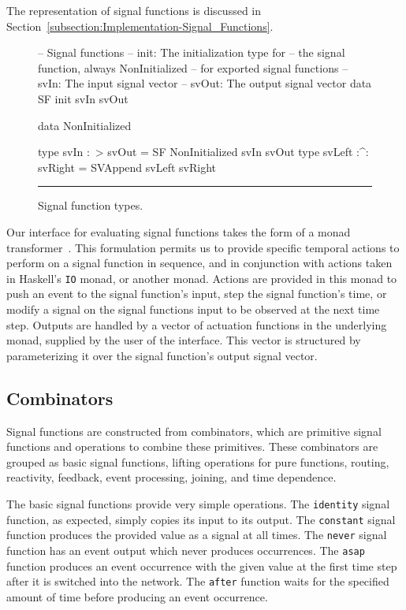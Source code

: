 The representation of signal functions is discussed in
Section~\ref{subsection:Implementation-Signal_Functions}.
\begin{figure}
\begin{code}
-- Signal functions
-- init: The initialization type for 
--   the signal function, always NonInitialized
--   for exported signal functions
-- svIn: The input signal vector
-- svOut: The output signal vector
data SF init svIn svOut

data NonInitialized

type svIn :~> svOut = SF NonInitialized svIn svOut
type svLeft :^: svRight = SVAppend svLeft svRight
\end{code}
\hrule
\caption{Signal function types.}
\label{figure:signal_function_types}
\end{figure}

Our interface for evaluating signal functions takes the form of a monad
transformer~\cite{Jones1995}. This formulation permits us to provide specific
temporal actions to perform on a signal function in sequence, and in conjunction
with actions taken in Haskell's {\tt IO} monad, or another monad. Actions are
provided in this monad to push an event to the signal function's input, step
the signal function's time, or modify a signal on the signal functions input to
be observed at the next time step. Outputs are handled by a vector of actuation
functions in the underlying monad, supplied by the user of the interface. This
vector is structured by parameterizing it over the signal function's output
signal vector.

\subsection{Combinators}
\label{section:System_Design_and_Interface-Combinators}

Signal functions are constructed from combinators, which are primitive signal
functions and operations to combine these primitives. These combinators are
grouped as basic signal functions, lifting operations for pure functions,
routing, reactivity, feedback, event processing, joining, and time dependence.

The basic signal functions
provide very simple operations. The {\tt identity} signal function, as expected,
simply copies its input to its output. The {\tt constant} signal function
produces the provided value as a signal at all times. The {\tt never} signal
function has an event output which never produces occurrences. The {\tt asap}
function produces an event occurrence with the given value at the first time
step after it is switched into the network. The {\tt after} function waits for
the specified amount of time before producing an event occurrence.


